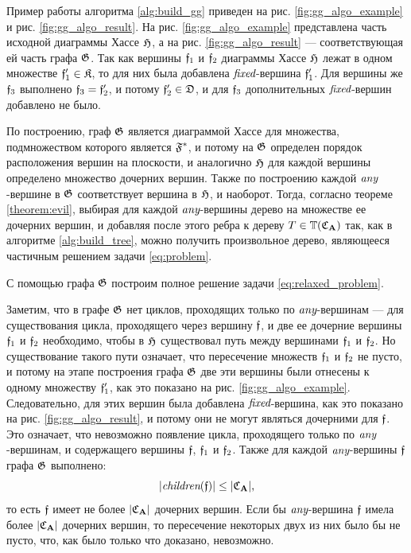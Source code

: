 Пример работы алгоритма \ref{alg:build_gg} приведен на рис. \ref{fig:gg_algo_example} и рис. \ref{fig:gg_algo_result}. На рис. \ref{fig:gg_algo_example} представлена часть исходной диаграммы Хассе $\mathfrak{H}$, а на рис. \ref{fig:gg_algo_result} --- соответствующая ей часть графа $\mathfrak{G}$. Так как вершины $\mathfrak{f}_1$ и $\mathfrak{f}_2$ диаграммы Хассе $\mathfrak{H}$ лежат в одном множестве $\mathfrak{f}'_1 \in \mathfrak{K}$, то для них была добавлена $\textit{fixed}$-вершина $\mathfrak{f}'_1$. Для вершины же $\mathfrak{f}_3$ выполнено $\mathfrak{f}_3 = \mathfrak{f}'_2$, и потому $\mathfrak{f}'_2 \in \mathfrak{D}$, и для $\mathfrak{f}_3$ дополнительных $\textit{fixed}$-вершин добавлено не было.

По построению, граф $\mathfrak{G}$ является диаграммой Хассе для множества, подмножеством которого является $\mathfrak{F}^*$, и потому на $\mathfrak{G}$ определен порядок расположения вершин на плоскости, и аналогично $\mathfrak{H}$ для каждой вершины определено множество дочерних вершин. Также по построению каждой $\textit{any}$-вершине в $\mathfrak{G}$ соответствует вершина в $\mathfrak{H}$, и наоборот. Тогда, согласно теореме \ref{theorem:evil}, выбирая для каждой $\textit{any}$-вершины дерево на множестве ее дочерних вершин, и добавляя после этого ребра к дереву $T \in \mathbb{T}(\mathfrak{C}_{\mathbf{A}})$ так, как в алгоритме \ref{alg:build_tree}, можно получить произвольное дерево, являющееся частичным решением задачи \ref{eq:problem}.


С помощью графа $\mathfrak{G}$ построим полное решение задачи \ref{eq:relaxed_problem}.


Заметим, что в графе $\mathfrak{G}$ нет циклов, проходящих только по $\textit{any}$-вершинам --- для существования цикла, проходящего через вершину $\mathfrak{f}$, и две ее дочерние вершины $\mathfrak{f}_1$ и $\mathfrak{f}_2$ необходимо, чтобы в $\mathfrak{H}$ существовал путь между вершинами $\mathfrak{f}_1$ и $\mathfrak{f}_2$. Но существование такого пути означает, что пересечение множеств $\mathfrak{f}_1$ и $\mathfrak{f}_2$ не пусто, и потому на этапе построения графа $\mathfrak{G}$ две эти вершины были отнесены к одному множеству $\mathfrak{f}'_1$, как это показано на рис. \ref{fig:gg_algo_example}. Следовательно, для этих вершин была добавлена $\textit{fixed}$-вершина, как это показано на рис. \ref{fig:gg_algo_result}, и потому они не могут являться дочерними для $\mathfrak{f}$. Это означает, что невозможно появление цикла, проходящего только по $\textit{any}$-вершинам, и содержащего вершины $\mathfrak{f}$, $\mathfrak{f}_1$ и $\mathfrak{f}_2$. Также для каждой $\textit{any}$-вершины $\mathfrak{f}$ графа $\mathfrak{G}$ выполнено:
\begin{equation}\label{eq:number_of_children}
|\textit{children}(\mathfrak{f})| \le |\mathfrak{C}_{\mathbf{A}}| \text{,}
\end{equation}
то есть $\mathfrak{f}$ имеет не более $|\mathfrak{C}_{\mathbf{A}}|$ дочерних вершин. Если бы $\textit{any}$-вершина $\mathfrak{f}$ имела более $|\mathfrak{C}_{\mathbf{A}}|$ дочерних вершин, то пересечение некоторых двух из них было бы не пусто, что, как было только что доказано, невозможно.

